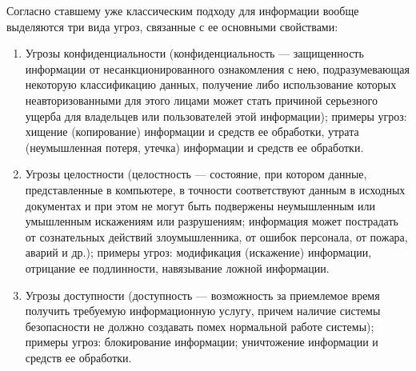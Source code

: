 Согласно ставшему уже классическим подходу для информации вообще выделяются три
вида угроз, связанные с ее основными свойствами:
\begin{enumerate}
  \item Угрозы конфиденциальности (конфиденциальность --- защищенность
  информации от несанкционированного ознакомления с нею, подразумевающая
  некоторую классификацию данных, получение либо использование которых
  неавторизованными для этого лицами может стать причиной серьезного ущерба для
  владельцев или пользователей этой информации); примеры угроз: хищение
  (копирование) информации и средств ее обработки, утрата (неумышленная потеря,
  утечка) информации и средств ее обработки.
  \item Угрозы целостности (целостность --- состояние, при котором данные,
  представленные в компьютере, в точности соответствуют данным в исходных
  документах и при этом не могут быть подвержены неумышленным или умышленным
  искажениям или разрушениям; информация может пострадать от сознательных
  действий злоумышленника, от ошибок персонала, от пожара, аварий и др.);
  примеры угроз: модификация (искажение) информации, отрицание ее подлинности,
  навязывание ложной информации.
  \item Угрозы доступности (доступность --- возможность за приемлемое время
  получить требуемую информационную услугу, причем наличие системы безопасности
  не должно создавать помех нормальной работе системы); примеры угроз:
  блокирование информации; уничтожение информации и средств ее обработки.
\end{enumerate}
 

